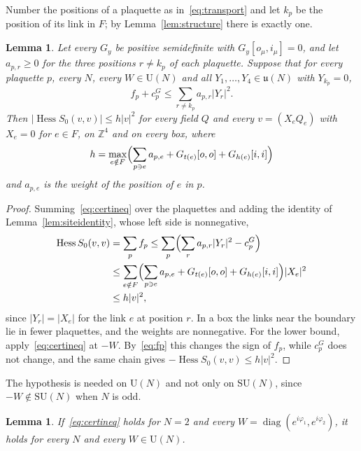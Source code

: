 \documentclass[aps,prd,twocolumn,superscriptaddress,nofootinbib,longbibliography,floatfix,amsmath,amssymb,10pt]{revtex4-2}
\newtheorem{lemma}[theorem]{Lemma}
\theoremstyle{definition}
\theoremstyle{remark}
\newcommand{\Z}{\mathbb{Z}}
\newcommand{\SU}{\mathrm{SU}}
\newcommand{\U}{\mathrm{U}}
\newcommand{\Hess}{\operatorname{Hess}}
\begin{document}
Number the positions of a plaquette as in~\eqref{eq:transport} and let
$k_p$ be the position of its link in $F$; by Lemma~\ref{lem:structure}
there is exactly one.

\begin{lemma}\label{lem:certificate}
Let every $G_y$ be positive semidefinite with $G_y[o_\mu,i_\mu]=0$, and let
$a_{p,r}\ge0$ for the three positions $r\ne k_p$ of each plaquette. Suppose
that for every plaquette $p$, every $N$, every $W\in\U(N)$ and all
$Y_1,\dots,Y_4\in\mathfrak u(N)$ with $Y_{k_p}=0$,
\begin{equation}\label{eq:certineq}
f_p+c^G_p\le\sum_{r\ne k_p}a_{p,r}|Y_r|^2 .
\end{equation}
Then $|\Hess S_0(v,v)|\le h|v|^2$ for every field $Q$ and every $v=(X_eQ_e)$
with $X_e=0$ for $e\in F$, on $\Z^4$ and on every box, where
\[
h=\max_{e\notin F}\Bigl(\sum_{p\ni e}a_{p,e}+G_{t(e)}[o,o]+G_{h(e)}[i,i]
\Bigr)
\]
and $a_{p,e}$ is the weight of the position of $e$ in $p$.
\end{lemma}

\begin{proof}
Summing~\eqref{eq:certineq} over the plaquettes and adding the identity of
Lemma~\ref{lem:siteidentity}, whose left side is nonnegative,
\[
\begin{split}
\Hess S_0(v,v)&=\sum_pf_p\le\sum_p\Bigl(\sum_ra_{p,r}|Y_r|^2-c^G_p\Bigr)\\
&\le\sum_{e\notin F}\Bigl(\sum_{p\ni e}a_{p,e}+G_{t(e)}[o,o]+G_{h(e)}[i,i]
\Bigr)|X_e|^2\\
&\le h|v|^2,
\end{split}
\]
since $|Y_r|=|X_e|$ for the link $e$ at position $r$. In a box the links
near the boundary lie in fewer plaquettes, and the weights are nonnegative.
For the lower bound, apply~\eqref{eq:certineq} at $-W$. By~\eqref{eq:fp}
this changes the sign of $f_p$, while $c^G_p$ does not change, and the same
chain gives $-\Hess S_0(v,v)\le h|v|^2$.
\end{proof}

The hypothesis is needed on $\U(N)$ and not only on $\SU(N)$, since
$-W\notin\SU(N)$ when $N$ is odd.

\begin{lemma}\label{lem:certu2}
If~\eqref{eq:certineq} holds for $N=2$ and every
$W=\operatorname{diag}(e^{i\varphi_1},e^{i\varphi_2})$, it holds for
every $N$ and every $W\in\U(N)$.
\end{lemma}
\end{document}
